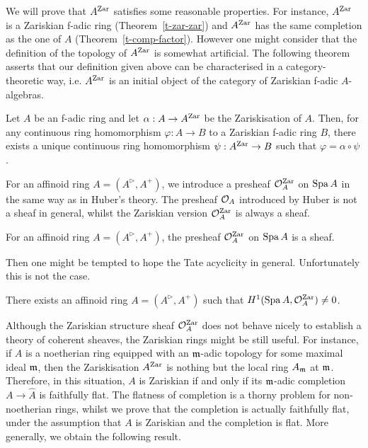 We will prove that $A^{{\operatorname{Zar}}}$ satisfies some reasonable properties. 
For instance, $A^{{\operatorname{Zar}}}$ is a Zariskian f-adic ring (Theorem~\ref{t-zar-zar}) and 
$A^{{\operatorname{Zar}}}$ has the same completion as the one of $A$ 
(Theorem~\ref{t-comp-factor}). 
However one might consider that 
the definition of the topology of $A^{{\operatorname{Zar}}}$ 
is somewhat artificial. 
The following theorem asserts that 
our definition given above can be characterised 
in a category-theoretic way, 
i.e. $A^{{\operatorname{Zar}}}$ is an initial object of 
the category of Zariskian f-adic $A$-algebras. 


\begin{thm}\label{intro-t-zar-univ}
Let $A$ be an f-adic ring and 
let $\alpha:A \to A^{{\operatorname{Zar}}}$ be the Zariskisation of $A$. 
Then, for any continuous ring homomorphism $\varphi:A \to B$ 
to a Zariskian f-adic ring $B$, 
there exists a unique continuous ring homomorphism 
$\psi:A^{{\operatorname{Zar}}} \to B$ such that $\varphi=\alpha \circ \psi$. 
\end{thm}





For an affinoid ring $A=(A^{\rhd}, A^+)$, 
we introduce a presheaf $\mathcal{O}_A^{{\operatorname{Zar}}}$ on ${\operatorname{Spa}}\,A$ 
in the same way as in Huber's theory. 
The presheaf $\mathcal{O}_A$ introduced by Huber is not a sheaf in general, 
whilst the Zariskian version $\mathcal{O}^{{\operatorname{Zar}}}_A$ 
is always a sheaf. 

\begin{thm}
For an affinoid ring $A=(A^{\rhd}, A^+)$, the presheaf $\mathcal{O}_A^{{\operatorname{Zar}}}$ on ${\operatorname{Spa}}\,A$ is a sheaf. 
\end{thm}

Then one might be tempted to hope 
the Tate acyclicity in general. 
Unfortunately this is not the case. 


\begin{thm}
There exists an affinoid ring $A=(A^{\rhd}, A^+)$ such that 
$H^1({\operatorname{Spa}}\,A, \mathcal{O}_A^{{\operatorname{Zar}}}) \neq 0$. 
\end{thm}


Although the Zariskian structure sheaf $\mathcal{O}_A^{{\operatorname{Zar}}}$ 
does not behave nicely 
to establish a theory of coherent sheaves, 
the Zariskian rings might be still useful. 
For instance, if $A$ is a noetherian ring equipped with an $\mathfrak{m}$-adic topology for some maximal ideal $\mathfrak{m}$, 
then the Zariskisation $A^{{\operatorname{Zar}}}$ is nothing but 
the local ring $A_{\mathfrak{m}}$ at $\mathfrak{m}$. 
Therefore, in this situation, 
$A$ is Zariskian if and only if its $\mathfrak{m}$-adic completion 
$A \to \widehat{A}$ is faithfully flat. 
The flatness of completion is a thorny problem 
for non-noetherian rings, 
whilst we prove that the completion is actually faithfully flat, 
under the assumption that $A$ is Zariskian and the completion is flat. 
More generally, we obtain the following result. 


